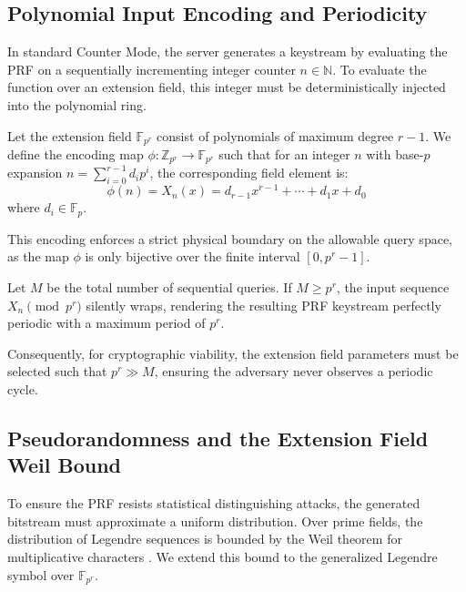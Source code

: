 \documentclass[runningheads]{llncs}
\begin{document}
\subsection{Polynomial Input Encoding and Periodicity} \label{Section 2.1}
In standard Counter Mode, the server generates a keystream by evaluating the PRF on a sequentially incrementing integer counter $n \in \mathbb{N}$. To evaluate the function over an extension field, this integer must be deterministically injected into the polynomial ring.

\begin{definition} \label{def:encoding}
Let the extension field $\mathbb{F}_{p^r}$ consist of polynomials of maximum degree $r-1$. We define the encoding map $\phi: \mathbb{Z}_{p^r} \to \mathbb{F}_{p^r}$ such that for an integer $n$ with base-$p$ expansion $n = \sum_{i=0}^{r-1} d_i p^i$, the corresponding field element is:
\begin{equation*}
    \phi(n) = X_n(x) = d_{r - 1}x^{r - 1} + \cdots + d_1x + d_0
\end{equation*}
where $d_i \in \mathbb{F}_p$.
\end{definition}

This encoding enforces a strict physical boundary on the allowable query space, as the map $\phi$ is only bijective over the finite interval $[0, p^r - 1]$.

\begin{proposition}
Let $M$ be the total number of sequential queries. If $M \geq p^r$, the input sequence $X_n \pmod{p^r}$ silently wraps, rendering the resulting PRF keystream perfectly periodic with a maximum period of $p^r$.
\end{proposition}

Consequently, for cryptographic viability, the extension field parameters must be selected such that $p^r \gg M$, ensuring the adversary never observes a periodic cycle.

\subsection{Pseudorandomness and the Extension Field Weil Bound}
To ensure the PRF resists statistical distinguishing attacks, the generated bitstream must approximate a uniform distribution. Over prime fields, the distribution of Legendre sequences is bounded by the Weil theorem for multiplicative characters \cite{weil1948}. We extend this bound to the generalized Legendre symbol over $\mathbb{F}_{p^r}$.
\end{document}
